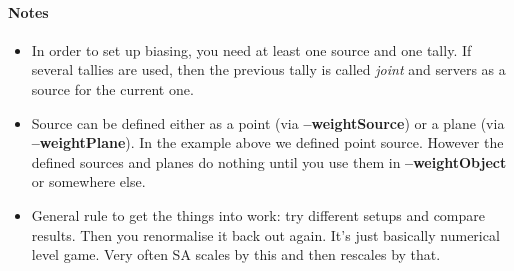 \paragraph{Notes}
\begin{itemize}
\item In order to set up biasing, you need at least one source and one tally. If several tallies are used, then the previous tally is called {\em joint} and servers as a source for the current one.
\item Source can be defined either as a point (via {\bf --weightSource}) or a plane (via {\bf --weightPlane}). In the example above we defined point source.
  However the defined sources and planes do nothing until you use them in {\bf --weightObject} or somewhere else.
\item General rule to get the things into work: try different setups and compare results. Then you renormalise it back out again. It's just basically numerical level game.
  Very often SA scales by this and then rescales by that.
\end{itemize}




